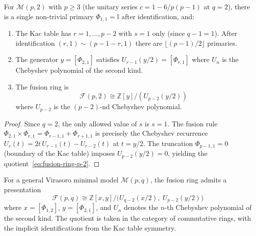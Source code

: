 \begin{proposition}\label{prop:fusion-ring-p-2}
For $\mathcal{M}(p,2)$ with $p \geq 3$ (the unitary series $c = 1 - 6/p(p{-}1)$
at $q = 2$), there is a single non-trivial primary $\Phi_{1,1} = \mathbb{I}$
after identification, and:
\begin{enumerate}
\item The Kac table has $r = 1, \ldots, p{-}2$ with $s = 1$ only (since $q{-}1 = 1$).
After identification $(r,1) \sim (p{-}1{-}r, 1)$ there are $\lfloor(p{-}1)/2\rfloor$ primaries.
\item The generator $y = [\Phi_{2,1}]$ satisfies
$U_{r-1}(y/2) = [\Phi_{r,1}]$ where $U_n$ is the Chebyshev polynomial
of the second kind.
\item The fusion ring is
\begin{equation}\label{eq:fusion-ring-p-2}
\mathcal{F}(p,2) \cong \mathbb{Z}[y]/(U_{p-2}(y/2))
\end{equation}
where $U_{p-2}$ is the $(p{-}2)$-nd Chebyshev polynomial.
\end{enumerate}
\end{proposition}

\begin{proof}
Since $q = 2$, the only allowed value of $s$ is $s = 1$. The fusion rule
$\Phi_{2,1}\times\Phi_{r,1} = \Phi_{r-1,1} + \Phi_{r+1,1}$ is precisely the
Chebyshev recurrence $U_r(t) = 2t\,U_{r-1}(t) - U_{r-2}(t)$ at $t = y/2$.
The truncation $\Phi_{p-1,1} = 0$ (boundary of the Kac table) imposes
$U_{p-2}(y/2) = 0$, yielding the quotient~\eqref{eq:fusion-ring-p-2}.
\end{proof}

\begin{theorem}\label{thm:fusion-ring-quotient}
For a general Virasoro minimal model $\mathcal{M}(p,q)$, the fusion ring admits
a presentation
\begin{equation}\label{eq:fusion-ring-pq}
\mathcal{F}(p,q) \cong \mathbb{Z}[x,y]\big/\bigl(U_{q-2}(x/2),\; U_{p-2}(y/2)\bigr)
\end{equation}
where $x = [\Phi_{1,2}]$, $y = [\Phi_{2,1}]$, and $U_n$ denotes the $n$-th
Chebyshev polynomial of the second kind. The quotient is taken in the category
of commutative rings, with the implicit identifications from the Kac table
symmetry.
\end{theorem}


